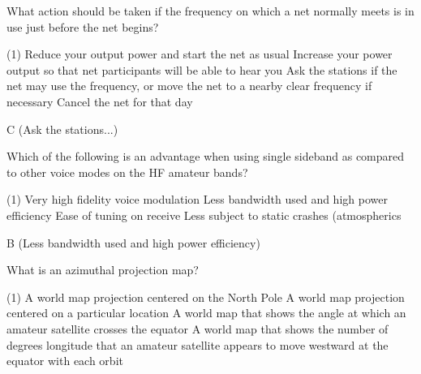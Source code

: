 \documentclass[a4paper]{article}
\begin{document}
\vspace{5mm}



\begin{question}What action should be taken if the frequency on which a net normally meets is in use just before the net begins?
	\begin{tasks}(1)
		\task Reduce your output power and start the net as usual
		\task Increase your power output so that net participants will be able to hear you
		\task Ask the stations if the net may use the frequency, or move the net to a nearby clear frequency if necessary
		\task Cancel the net for that day
	\end{tasks}
\end{question}

\begin{solution}
	C (Ask the stations...)
\end{solution}

\vspace{5mm}


\begin{question}Which of the following is an advantage when using single sideband as compared to other voice modes on the HF amateur bands?
	\begin{tasks}(1)
		\task Very high fidelity voice modulation
		\task Less bandwidth used and high power efficiency
		\task Ease of tuning on receive
		\task Less subject to static crashes (atmospherics
	\end{tasks}
\end{question}

\begin{solution}
	B (Less bandwidth used and high power efficiency)
\end{solution}

\vspace{5mm}



\begin{question}What is an azimuthal projection map?
	\begin{tasks}(1)
		\task A world map projection centered on the North Pole
		\task A world map projection centered on a particular location
		\task A world map that shows the angle at which an amateur satellite crosses the equator
		\task A world map that shows the number of degrees longitude that an amateur satellite appears to move westward at the equator with each orbit
	\end{tasks}
\end{question}
\end{document}
